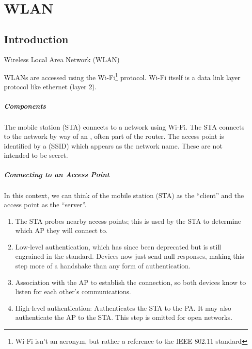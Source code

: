 \chapter{WLAN}
\section{Introduction}
\begin{dfnbox}{Wireless Local Area Network (WLAN)}{}
\end{dfnbox}

WLANs are accessed using the Wi-Fi\footnote{Wi-Fi isn't an acronym, but rather a reference to the IEEE 802.11 standard} protocol. Wi-Fi itself is a data link layer protocol like ethernet (layer 2).

\paragraph{Components}
The mobile station (STA) connects to a network using Wi-Fi. The STA connects to the network by way of an , often part of the router. The access point is identified by a  (SSID) which appears as the network name. These are not intended to be secret.

\paragraph{Connecting to an Access Point}
In this context, we can think of the mobile station (STA) as the ``client'' and the access point as the ``server''.
\begin{enumerate}
    \item The STA probes nearby access points; this is used by the STA to determine which AP they will connect to.
    \item Low-level authentication, which has since been deprecated but is still engrained in the standard. Devices now just send null responses, making this step more of a handshake than any form of authentication.
    \item Association with the AP to establish the connection, so both devices know to listen for each other's communications.
    \item High-level authentication: Authenticates the STA to the PA. It may also authenticate the AP to the STA. This step is omitted for open networks.
\end{enumerate}

